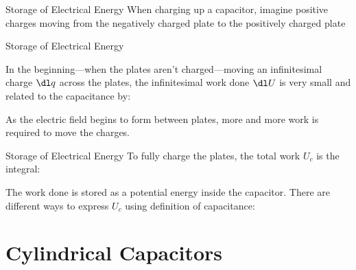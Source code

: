 \documentclass[12pt,aspectratio=169]{beamer}
\begin{document}
\begin{frame}{Storage of Electrical Energy}
  When charging up a capacitor, imagine positive charges moving from the
  negatively charged plate to the positively charged plate
  \begin{center}
  \end{center}
\end{frame}



\begin{frame}{Storage of Electrical Energy}
  \begin{center}
  \end{center}
  In the beginning---when the plates aren't charged---moving an infinitesimal
  charge $\dl q$ across the plates, the infinitesimal work done $\dl U$ is very
  small and related to the capacitance by:

  
  As the electric field begins to form between plates, more and more work
  is required to move the charges.
\end{frame}



\begin{frame}{Storage of Electrical Energy}
  To fully charge the plates, the total work $U_c$ is the integral:


  The work done is stored as a potential energy inside the capacitor. There are
  different ways to express $U_c$ using definition of capacitance:

\end{frame}



\section{Cylindrical Capacitors}
\end{document}
